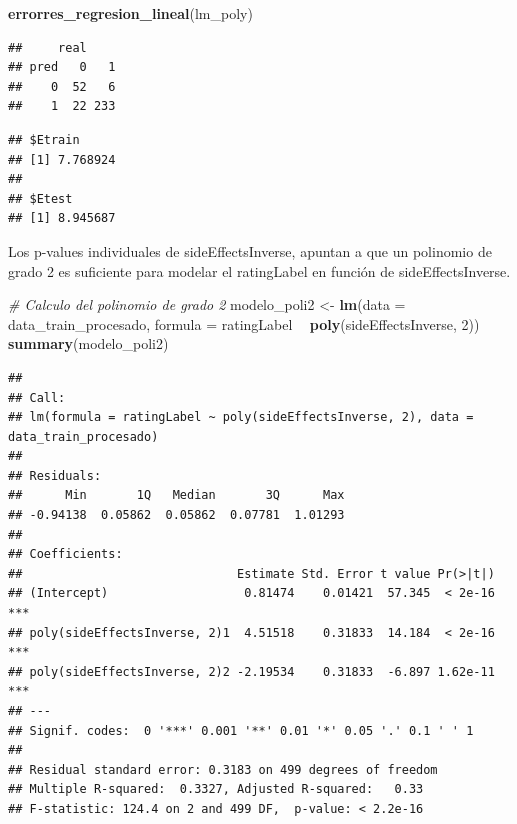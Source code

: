 \documentclass[spanish,]{article}
\newenvironment{Shaded}{\begin{snugshade}}{\end{snugshade}}
\newcommand{\KeywordTok}[1]{\textcolor[rgb]{0.13,0.29,0.53}{\textbf{#1}}}
\newcommand{\DataTypeTok}[1]{\textcolor[rgb]{0.13,0.29,0.53}{#1}}
\newcommand{\DecValTok}[1]{\textcolor[rgb]{0.00,0.00,0.81}{#1}}
\newcommand{\StringTok}[1]{\textcolor[rgb]{0.31,0.60,0.02}{#1}}
\newcommand{\CommentTok}[1]{\textcolor[rgb]{0.56,0.35,0.01}{\textit{#1}}}
\newcommand{\OperatorTok}[1]{\textcolor[rgb]{0.81,0.36,0.00}{\textbf{#1}}}
\newcommand{\NormalTok}[1]{#1}
\begin{document}
\begin{Shaded}
\begin{Highlighting}[]
\KeywordTok{errorres_regresion_lineal}\NormalTok{(lm_poly)}
\end{Highlighting}
\end{Shaded}

\begin{verbatim}
##     real
## pred   0   1
##    0  52   6
##    1  22 233
\end{verbatim}

\begin{verbatim}
## $Etrain
## [1] 7.768924
## 
## $Etest
## [1] 8.945687
\end{verbatim}

Los p-values individuales de sideEffectsInverse, apuntan a que un
polinomio de grado 2 es suficiente para modelar el ratingLabel en
función de sideEffectsInverse.

\begin{Shaded}
\begin{Highlighting}[]
\CommentTok{# Calculo del polinomio de grado 2}
\NormalTok{modelo_poli2 <-}\StringTok{ }\KeywordTok{lm}\NormalTok{(}\DataTypeTok{data =}\NormalTok{ data_train_procesado, }\DataTypeTok{formula =}\NormalTok{ ratingLabel }\OperatorTok{~}\StringTok{ }\KeywordTok{poly}\NormalTok{(sideEffectsInverse, }\DecValTok{2}\NormalTok{))}
\KeywordTok{summary}\NormalTok{(modelo_poli2)}
\end{Highlighting}
\end{Shaded}

\begin{verbatim}
## 
## Call:
## lm(formula = ratingLabel ~ poly(sideEffectsInverse, 2), data = data_train_procesado)
## 
## Residuals:
##      Min       1Q   Median       3Q      Max 
## -0.94138  0.05862  0.05862  0.07781  1.01293 
## 
## Coefficients:
##                              Estimate Std. Error t value Pr(>|t|)    
## (Intercept)                   0.81474    0.01421  57.345  < 2e-16 ***
## poly(sideEffectsInverse, 2)1  4.51518    0.31833  14.184  < 2e-16 ***
## poly(sideEffectsInverse, 2)2 -2.19534    0.31833  -6.897 1.62e-11 ***
## ---
## Signif. codes:  0 '***' 0.001 '**' 0.01 '*' 0.05 '.' 0.1 ' ' 1
## 
## Residual standard error: 0.3183 on 499 degrees of freedom
## Multiple R-squared:  0.3327, Adjusted R-squared:   0.33 
## F-statistic: 124.4 on 2 and 499 DF,  p-value: < 2.2e-16
\end{verbatim}
\end{document}
